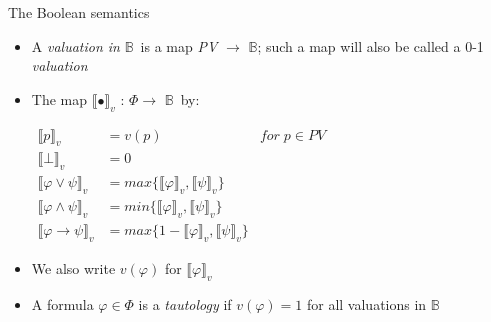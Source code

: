 \documentclass[sans]{beamer}
\begin{document}
\newcommand{\vsem}[1]{\llbracket #1 \rrbracket_v}
\newcommand{\vmsem}[1]{$\llbracket #1 \rrbracket_v$}
\newcommand{\got}[1]{$\mathbb{#1}$}
\newcommand{\gotb}{\got{B}}
\newcommand{\cali}[1]{$\mathcal{#1} \;$}
\newcommand{\calr}{\cali{R}}

\begin{frame}{The Boolean semantics}
  \begin{itemize}
    \item A \emph{valuation in} \gotb $\,$ is a map \emph{PV} $\to$ \gotb;
      such a map will also be called a 0-1 \emph{valuation}

    \vfill

    \item The map \vmsem{\bullet} : $\Phi \to$ \gotb $\,$ by:

      $\begin{aligned}
        \vsem{p} &= v(p) & for \; p \in PV \\
        \vsem{\bot} &= 0 \\
        \vsem{\varphi \vee \psi} &= max\{\vsem{\varphi}, \vsem{\psi}\} \\
        \vsem{\varphi \wedge \psi} &= min\{\vsem{\varphi}, \vsem{\psi}\}\\
        \vsem{\varphi \to \psi} &= max\{1 - \vsem{\varphi}, \vsem{\psi}\}
       \end{aligned}$

    \vfill
    \item We also write $v(\varphi)$ for \vmsem{\varphi}

    \vfill
  \item A formula $\varphi \in \Phi$ is a \emph{tautology} if $v(\varphi) = 1$ for
        all valuations in \gotb
  \end{itemize}
\end{frame}
\end{document}

